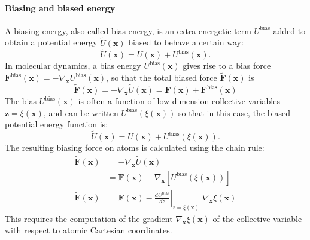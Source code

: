 \documentclass[9pt,review]{livecoms}
\newcommand{\vx}{\mathbf{x}}
\newcommand{\vz}{\mathbf{z}}
\newcommand{\vF}{\mathbf{F}}
\begin{document}
\hypertarget{ref:biasingE} {\paragraph{Biasing and biased energy}}
A biasing energy, also called bias energy, is an extra energetic term $U^\mathrm{bias}$ added to obtain a potential energy $\tilde{U}(\vx)$ biased to behave a certain way:
\begin{equation}
\tilde{U}(\vx) =  U(\vx) + U^\mathrm{bias}(\vx).
\end{equation}
In molecular dynamics, a bias energy
$U^\mathrm{bias}(\vx)$ gives rise to a bias force $\vF^\mathrm{bias}(\vx) = -\nabla_{\vx} U^\mathrm{bias}(\vx)$, so that the total biased force $\tilde{\vF}(\vx)$ is
\begin{equation}
\tilde{\vF}(\vx) = -\nabla_{\vx} \tilde U(\vx) = \vF(\vx) + \vF^\mathrm{bias}(\vx)
\end{equation}
The bias $U^\mathrm{bias}(\vx)$ is often a function of low-dimension \hyperlink{ref:CV} {collective variable}s $\vz = \xi(\vx)$, and can be written $U^\mathrm{bias}(\xi(\vx))$ so that in this case, the biased potential energy function is:
\begin{equation}
\tilde{U}(\vx) =  U(\vx) + U^\mathrm{bias}(\xi(\vx)).
\end{equation}
The resulting biasing force on atoms is calculated using the chain rule:
\begin{align}
\tilde{\vF}(\vx) &= -\nabla_{\vx} \tilde U(\vx) \\
&= \vF(\vx) -\nabla_{\vx} [ U^\mathrm{bias}(\xi(\vx))]\\
\tilde{\vF}(\vx)&= \vF(\vx) - \left . \frac{dU^\mathrm{bias}}{dz}\right |_{z=\xi(\vx)} \; \nabla_{\vx}\xi(\vx)
\end{align}
This requires the computation of the gradient $\nabla_{\vx}\xi(\vx)$ of the collective variable with respect to atomic Cartesian coordinates.
\end{document}
